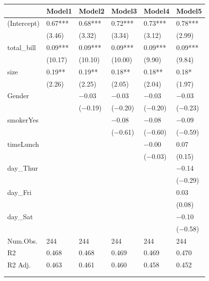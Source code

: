 \documentclass[
  letterpaper,
  DIV=11,
  numbers=noendperiod]{scrreprt}
\begin{document}
\begin{table}
\centering\centering
\begin{tabu} to 
\toprule
  & Model1 & Model2 & Model3 & Model4 & Model5\\
\midrule
(Intercept) & \num{0.67}*** & \num{0.68}*** & \num{0.72}*** & \num{0.73}*** & \num{0.78}***\\
 & (\num{3.46}) & (\num{3.32}) & (\num{3.34}) & (\num{3.12}) & (\num{2.99})\\
total\_bill & \num{0.09}*** & \num{0.09}*** & \num{0.09}*** & \num{0.09}*** & \num{0.09}***\\
 & (\num{10.17}) & (\num{10.10}) & (\num{10.00}) & (\num{9.90}) & (\num{9.84})\\
size & \num{0.19}** & \num{0.19}** & \num{0.18}** & \num{0.18}** & \num{0.18}*\\
 & (\num{2.26}) & (\num{2.25}) & (\num{2.05}) & (\num{2.04}) & (\num{1.97})\\
Gender &  & \num{-0.03} & \num{-0.03} & \num{-0.03} & \num{-0.03}\\
 &  & (\num{-0.19}) & (\num{-0.20}) & (\num{-0.20}) & (\num{-0.23})\\
smokerYes &  &  & \num{-0.08} & \num{-0.08} & \num{-0.09}\\
 &  &  & (\num{-0.61}) & (\num{-0.60}) & (\num{-0.59})\\
timeLunch &  &  &  & \num{-0.00} & \num{0.07}\\
 &  &  &  & (\num{-0.03}) & (\num{0.15})\\
day\_Thur &  &  &  &  & \num{-0.14}\\
 &  &  &  &  & (\num{-0.29})\\
day\_Fri &  &  &  &  & \num{0.03}\\
 &  &  &  &  & (\num{0.08})\\
day\_Sat &  &  &  &  & \num{-0.10}\\
 &  &  &  &  & (\num{-0.58})\\
\midrule
Num.Obs. & \num{244} & \num{244} & \num{244} & \num{244} & \num{244}\\
R2 & \num{0.468} & \num{0.468} & \num{0.469} & \num{0.469} & \num{0.470}\\
R2 Adj. & \num{0.463} & \num{0.461} & \num{0.460} & \num{0.458} & \num{0.452}\\
\bottomrule
{}\\
\\
\end{tabu}
\end{table}
\end{document}
